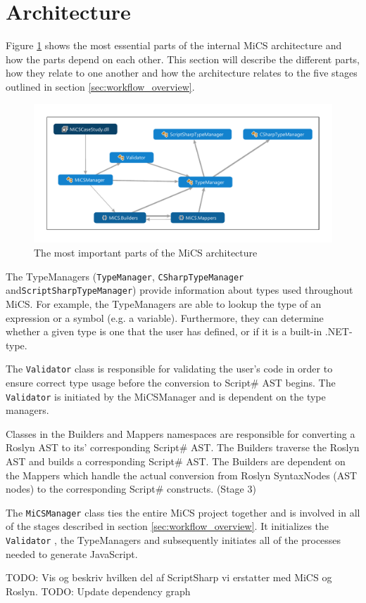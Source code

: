 \section{Architecture} %
\label{sec:architecture}
Figure \ref{fig:dependencygraph} shows the most essential parts of the internal MiCS architecture and how the parts depend on each other. 
This section will describe the different parts, how they relate to one another and how the architecture relates to the five stages outlined in section \ref{sec:workflow_overview}. 

\begin{figure}
	\begin{center}
		\centerline{\includegraphics[width=18cm]{resources/images/dependencygraph.pdf}}
	\end{center}
	\caption{The most important parts of the MiCS architecture}
	\label{fig:dependencygraph}
\end{figure}


The TypeManagers (\texttt{TypeManager}, \texttt{CSharpTypeManager} and\newline \texttt{ScriptSharpTypeManager}) provide information about types used throughout MiCS. For example, the TypeManagers are able to lookup the type of an expression or a symbol (e.g. a variable). Furthermore, they can determine whether a given type is one that the user has defined, or if it is a built-in .NET-type.

The \texttt{Validator} class is responsible for validating the user's code in order to ensure correct type usage before the conversion to Script\# AST begins. The \texttt{Validator} is initiated by the MiCSManager and is dependent on the type managers.

Classes in the Builders and Mappers namespaces are responsible for converting a Roslyn AST to its' corresponding Script\# AST. The Builders traverse the Roslyn AST and builds a corresponding Script\# AST. The Builders are dependent on the Mappers which handle the actual conversion from Roslyn SyntaxNodes (AST nodes) to the corresponding Script\# constructs. (Stage 3)

The \texttt{MiCSManager} class ties the entire MiCS project together and is involved in all of the stages described in section \ref{sec:workflow_overview}. It initializes the \texttt{Validator} ,  the TypeManagers and subsequently initiates all of the processes needed to generate JavaScript. 

TODO: Vis og beskriv hvilken del af ScriptSharp vi erstatter med MiCS og Roslyn.
TODO: Update dependency graph

